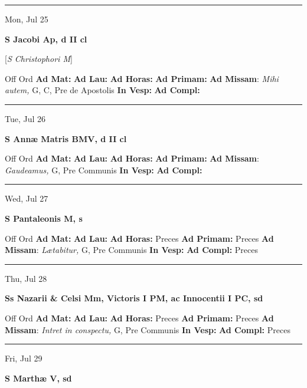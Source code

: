 \documentclass[letterpaper, 10pt]{article}
\begin{document}
\hrule
\begin{center}
Mon, Jul 25
\end{center}\textbf{ \large S Jacobi Ap, \textnormal{\normalsize d II cl}}

[\textit{S Christophori M}]
\begin{justify}
Off Ord
\textbf{Ad Mat: }
\textbf{Ad Lau: }
\textbf{Ad Horas: }
\textbf{Ad Primam: }
\textbf{Ad Missam}: \textit{Mihi autem,} G, C, Pre de Apostolis
\textbf{In Vesp: }
\textbf{Ad Compl: }\end{justify}



\hrule
\begin{center}
Tue, Jul 26
\end{center}\textbf{ \large S Annæ Matris BMV, \textnormal{\normalsize d II cl}}
\begin{justify}
Off Ord
\textbf{Ad Mat: }
\textbf{Ad Lau: }
\textbf{Ad Horas: }
\textbf{Ad Primam: }
\textbf{Ad Missam}: \textit{Gaudeamus,} G, Pre Communis
\textbf{In Vesp: }
\textbf{Ad Compl: }\end{justify}



\hrule
\begin{center}
Wed, Jul 27
\end{center}\textbf{ \large S Pantaleonis M, \textnormal{\normalsize s}}
\begin{justify}
Off Ord
\textbf{Ad Mat: }
\textbf{Ad Lau: }
\textbf{Ad Horas: }Preces
\textbf{Ad Primam: }Preces
\textbf{Ad Missam}: \textit{Lætabitur,} G, Pre Communis
\textbf{In Vesp: }
\textbf{Ad Compl: }Preces\end{justify}



\hrule
\begin{center}
Thu, Jul 28
\end{center}\textbf{ \large Ss Nazarii \& Celsi Mm, Victoris I PM, ac Innocentii I PC, \textnormal{\normalsize sd}}
\begin{justify}
Off Ord
\textbf{Ad Mat: }
\textbf{Ad Lau: }
\textbf{Ad Horas: }Preces
\textbf{Ad Primam: }Preces
\textbf{Ad Missam}: \textit{Intret in conspectu,} G, Pre Communis
\textbf{In Vesp: }
\textbf{Ad Compl: }Preces\end{justify}



\hrule
\begin{center}
Fri, Jul 29
\end{center}\textbf{ \large S Marthæ V, \textnormal{\normalsize sd}}
\end{document}
